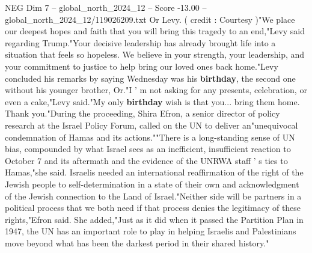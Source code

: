 \begin{textsample}{NEG Dim 7 – global\_north\_2024\_12 – Score -13.00 – global\_north\_2024\_12/119026209.txt}
Or Levy. ( credit : Courtesy )"We place our deepest hopes and faith that you will bring this tragedy to an end,"Levy said regarding Trump."Your decisive leadership has already brought life into a situation that feels so hopeless.
We believe in your strength, your leadership, and your commitment to justice to help bring our loved ones back home."Levy concluded his remarks by saying Wednesday was his \textbf{birthday}, the second one without his younger brother, Or."I ' m not asking for any presents, celebration, or even a cake,"Levy said."My only \textbf{birthday} wish is that you... bring them home.
Thank you."During the proceeding, Shira Efron, a senior director of policy research at the Israel Policy Forum, called on the UN to deliver an"unequivocal condemnation of Hamas and its actions.""There is a long-standing sense of UN bias, compounded by what Israel sees as an inefficient, insufficient reaction to October 7 and its aftermath and the evidence of the UNRWA staff ' s ties to Hamas,"she said.
Israelis needed an international reaffirmation of the right of the Jewish people to self-determination in a state of their own and acknowledgment of the Jewish connection to the Land of Israel."Neither side will be partners in a political process that we both need if that process denies the legitimacy of these rights,"Efron said.
She added,"Just as it did when it passed the Partition Plan in 1947, the UN has an important role to play in helping Israelis and Palestinians move beyond what has been the darkest period in their shared history."

\end{textsample}
